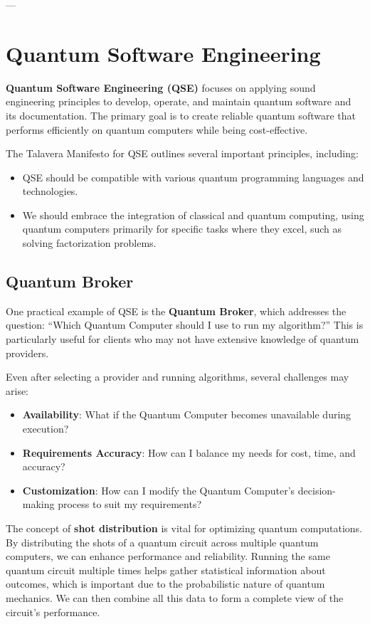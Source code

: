 ---

\section{Quantum Software Engineering}

\textbf{Quantum Software Engineering (QSE)} focuses on applying sound engineering principles to develop, operate, and maintain quantum software and its documentation. The primary goal is to create reliable quantum software that performs efficiently on quantum computers while being cost-effective.

The Talavera Manifesto for QSE outlines several important principles, including:

\begin{itemize}
    \item QSE should be compatible with various quantum programming languages and technologies.
    \item We should embrace the integration of classical and quantum computing, using quantum computers primarily for specific tasks where they excel, such as solving factorization problems.
\end{itemize}

\subsection{Quantum Broker}

One practical example of QSE is the \textbf{Quantum Broker}, which addresses the question: “Which Quantum Computer should I use to run my algorithm?” This is particularly useful for clients who may not have extensive knowledge of quantum providers.

Even after selecting a provider and running algorithms, several challenges may arise:

\begin{itemize}
    \item \textbf{Availability}: What if the Quantum Computer becomes unavailable during execution?
    \item \textbf{Requirements Accuracy}: How can I balance my needs for cost, time, and accuracy?
    \item \textbf{Customization}: How can I modify the Quantum Computer’s decision-making process to suit my requirements?
\end{itemize}

The concept of \textbf{shot distribution} is vital for optimizing quantum computations. By distributing the shots of a quantum circuit across multiple quantum computers, we can enhance performance and reliability. Running the same quantum circuit multiple times helps gather statistical information about outcomes, which is important due to the probabilistic nature of quantum mechanics. We can then combine all this data to form a complete view of the circuit’s performance.

